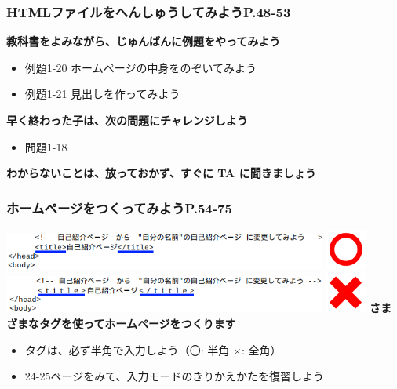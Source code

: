 \documentclass[dvipdfmx]{beamer}
\begin{document}
\begin{frame}[fragile]
	\frametitle{HTMLファイルをへんしゅうしてみようP.48-53~~~}
      \large\textbf{教科書をよみながら、じゅんばんに例題をやってみよう}
				\begin{itemize}
					\item 例題1-20 ホームページの中身をのぞいてみよう
					\item 例題1-21 見出しを作ってみよう
				\end{itemize}
      \vfill
      \large\textbf{早く終わった子は、次の問題にチャレンジしよう}
      \begin{itemize}
        \item 問題1-18
      \end{itemize}
      \vfill
      \large\textbf{わからないことは、放っておかず、すぐに TA に聞きましょう}
\end{frame}

\begin{frame}[fragile]
	\frametitle{ホームページをつくってみようP.54-75~~~}
    \includegraphics[width=0.8\textwidth]{slide04_006.png}
    \hfill
    \includegraphics[width=0.1\textwidth]{slide04_008.png}
    \vfill
    \includegraphics[width=0.8\textwidth]{slide04_007.png}
    \hfill
    \includegraphics[width=0.1\textwidth]{slide04_009.png}
    \vfill
    \large\textbf{さまざまなタグを使ってホームページをつくります}
        \begin{itemize}
          \item タグは、必ず\textcolor[rgb]{1.0,0.2,0.2}{半角}で入力しよう（〇: 半角 ×: 全角）
          \item 24-25ページをみて、入力モードのきりかえかたを復習しよう
        \end{itemize}
\end{frame}
\end{document}

